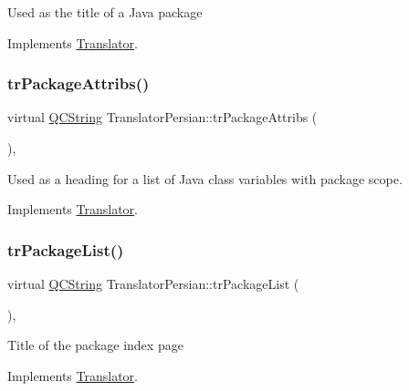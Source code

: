 Used as the title of a Java package 

Implements \mbox{\hyperlink{class_translator}{Translator}}.

\mbox{\label{class_translator_persian_a849cc9bd373965760be5063531a605fa}} 
\subsubsection{\texorpdfstring{trPackageAttribs()}{trPackageAttribs()}}
{\footnotesize\ttfamily virtual \mbox{\hyperlink{class_q_c_string}{Q\+C\+String}} Translator\+Persian\+::tr\+Package\+Attribs (\begin{DoxyParamCaption}{ }\end{DoxyParamCaption})\hspace{0.3cm}{\ttfamily [inline]}, {\ttfamily [virtual]}}

Used as a heading for a list of Java class variables with package scope. 

Implements \mbox{\hyperlink{class_translator}{Translator}}.

\mbox{\label{class_translator_persian_ab1f6a19166bde63307a56d6cad2f5d20}} 
\subsubsection{\texorpdfstring{trPackageList()}{trPackageList()}}
{\footnotesize\ttfamily virtual \mbox{\hyperlink{class_q_c_string}{Q\+C\+String}} Translator\+Persian\+::tr\+Package\+List (\begin{DoxyParamCaption}{ }\end{DoxyParamCaption})\hspace{0.3cm}{\ttfamily [inline]}, {\ttfamily [virtual]}}

Title of the package index page 

Implements \mbox{\hyperlink{class_translator}{Translator}}.

\mbox{\label{class_translator_persian_ab069ed7ed8bd3627485d4ad631f164bb}} 
